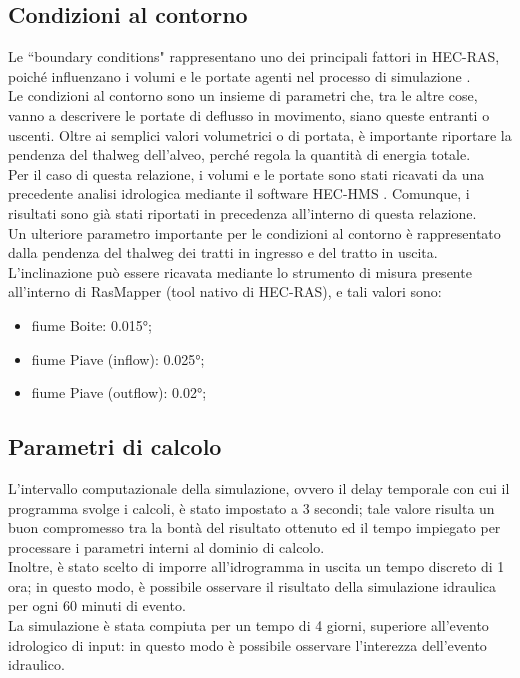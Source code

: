\subsection{Condizioni al contorno}
Le ``boundary conditions" rappresentano uno dei principali fattori in HEC-RAS, poiché influenzano i volumi e le portate agenti nel processo di simulazione \cite{boundary_conditions}.\\
Le condizioni al contorno sono un insieme di parametri che, tra le altre cose, vanno a descrivere le portate di deflusso in movimento, siano queste entranti o uscenti. Oltre ai semplici valori volumetrici o di portata, è importante riportare la pendenza del thalweg dell'alveo, perché regola la quantità di energia totale.\\
Per il caso di questa relazione, i volumi e le portate sono stati ricavati da una precedente analisi idrologica mediante il software HEC-HMS \cite{progetto_hms}. Comunque, i risultati sono già stati riportati in precedenza all'interno di questa relazione.\\
Un ulteriore parametro importante per le condizioni al contorno è rappresentato dalla pendenza del thalweg dei tratti in ingresso e del tratto in uscita.\\
L'inclinazione può essere ricavata mediante lo strumento di misura presente all'interno di RasMapper (tool nativo di HEC-RAS), e tali valori sono:
\begin{itemize}
    \item fiume Boite: 0.015°;
    \item fiume Piave (inflow): 0.025°;
    \item fiume Piave (outflow): 0.02°;
\end{itemize}

\subsection{Parametri di calcolo}
L'intervallo computazionale della simulazione, ovvero il delay temporale con cui il programma svolge i calcoli, è stato impostato a 3 secondi; tale valore risulta un buon compromesso tra la bontà del risultato ottenuto ed il tempo impiegato per processare i parametri interni al dominio di calcolo.\\
Inoltre, è stato scelto di imporre all'idrogramma in uscita un tempo discreto di 1 ora; in questo modo, è possibile osservare il risultato della simulazione idraulica per ogni 60 minuti di evento.\\
La simulazione è stata compiuta per un tempo di 4 giorni, superiore all'evento idrologico di input: in questo modo è possibile osservare l'interezza dell'evento idraulico. 